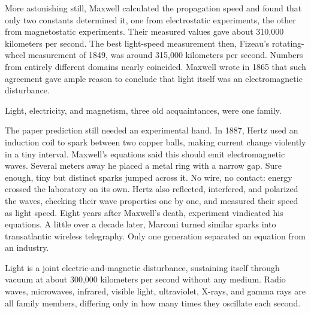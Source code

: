 \begin{mainline}
More astonishing still, Maxwell calculated the propagation speed and found that only two constants determined it, one from electrostatic experiments, the other from magnetostatic experiments. Their measured values gave about 310,000 kilometers per second. The best light-speed measurement then, Fizeau's rotating-wheel measurement of 1849, was around 315,000 kilometers per second. Numbers from entirely different domains nearly coincided. Maxwell wrote in 1865 that such agreement gave ample reason to conclude that light itself was an electromagnetic disturbance.

Light, electricity, and magnetism, three old acquaintances, were one family.

The paper prediction still needed an experimental hand. In 1887, Hertz used an induction coil to spark between two copper balls, making current change violently in a tiny interval. Maxwell's equations said this should emit electromagnetic waves. Several meters away he placed a metal ring with a narrow gap. Sure enough, tiny but distinct sparks jumped across it. No wire, no contact: energy crossed the laboratory on its own. Hertz also reflected, interfered, and polarized the waves, checking their wave properties one by one, and measured their speed as light speed. Eight years after Maxwell's death, experiment vindicated his equations. A little over a decade later, Marconi turned similar sparks into transatlantic wireless telegraphy. Only one generation separated an equation from an industry.
\end{mainline}


\begin{oneline}
Light is a joint electric-and-magnetic disturbance, sustaining itself through vacuum at about 300,000 kilometers per second without any medium. Radio waves, microwaves, infrared, visible light, ultraviolet, X-rays, and gamma rays are all family members, differing only in how many times they oscillate each second.
\end{oneline}


